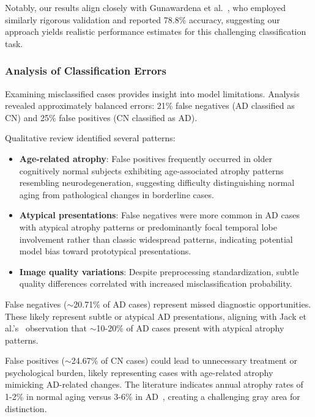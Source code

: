\documentclass[12pt, a4paper]{article}
\begin{document}
Notably, our results align closely with Gunawardena et al.~\cite{gunawardena2017applying}, who employed similarly rigorous validation and reported 78.8\% accuracy, suggesting our approach yields realistic performance estimates for this challenging classification task.

\subsubsection{Analysis of Classification Errors}

Examining misclassified cases provides insight into model limitations. Analysis revealed approximately balanced errors: 21\% false negatives (AD classified as CN) and 25\% false positives (CN classified as AD).

Qualitative review identified several patterns:

\begin{itemize}
    \item \textbf{Age-related atrophy}: False positives frequently occurred in older cognitively normal subjects exhibiting age-associated atrophy patterns resembling neurodegeneration, suggesting difficulty distinguishing normal aging from pathological changes in borderline cases.
    
    \item \textbf{Atypical presentations}: False negatives were more common in AD cases with atypical atrophy patterns or predominantly focal temporal lobe involvement rather than classic widespread patterns, indicating potential model bias toward prototypical presentations.
    
    \item \textbf{Image quality variations}: Despite preprocessing standardization, subtle quality differences correlated with increased misclassification probability.
\end{itemize}

False negatives ($\sim$20.71\% of AD cases) represent missed diagnostic opportunities. These likely represent subtle or atypical AD presentations, aligning with Jack et al.'s~\cite{jack2013tracking} observation that $\sim$10-20\% of AD cases present with atypical atrophy patterns.

False positives ($\sim$24.67\% of CN cases) could lead to unnecessary treatment or psychological burden, likely representing cases with age-related atrophy mimicking AD-related changes. The literature indicates annual atrophy rates of 1-2\% in normal aging versus 3-6\% in AD~\cite{vemuri2010role}, creating a challenging gray area for distinction.
\end{document}
